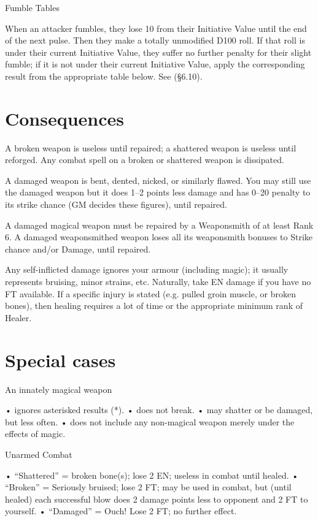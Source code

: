 \begin{Chapter}{Fumble Tables}

When an attacker fumbles, they lose 10 from their Initiative Value
until the end of the next pulse.  Then they make a totally unmodified
D100 roll.  If that roll is under their current Initiative Value, they
suffer no further penalty for their slight fumble; if it is not under
their current Initiative Value, apply the corresponding result from
the appropriate table below. See (§6.10).

\section{Consequences}

A broken weapon is useless until repaired; a shattered weapon is
useless until reforged. Any combat spell on a broken or shattered
weapon is dissipated.

A damaged weapon is bent, dented, nicked, or similarly flawed.  You
may still use the damaged weapon but it does 1–2 points less damage
and has 0–20 penalty to its strike chance (GM decides these figures),
until repaired.

A damaged magical weapon must be repaired by a Weaponsmith of at least
Rank 6.  A damaged weaponsmithed weapon loses all its weaponsmith
bonuses to Strike chance and/or Damage, until repaired.

Any self-inflicted damage ignores your armour (including magic); it
usually represents bruising, minor strains, etc.  Naturally, take EN
damage if you have no FT available.  If a specific injury is stated
(e.g. pulled groin muscle, or broken bones), then healing requires a
lot of time or the appropriate minimum rank of Healer.

\section{Special cases}

An innately magical weapon  

• ignores asterisked results (*).  
• does not break.  
• may shatter or be damaged, but less often.  
• does not include any non-magical weapon merely 
under the effects of magic. 

Unarmed Combat  

•  “Shattered” = broken bone(s); lose 2 EN; useless in combat until healed.  
•  “Broken” = Seriously bruised; lose 2 FT; may be used  in  combat,  but  (until  healed)  each  successful 
blow does 2 damage points less to opponent and 2 FT to yourself.  
•    “Damaged”  =  Ouch!  Lose  2  FT;  no  further  effect. 


\end{Chapter}
